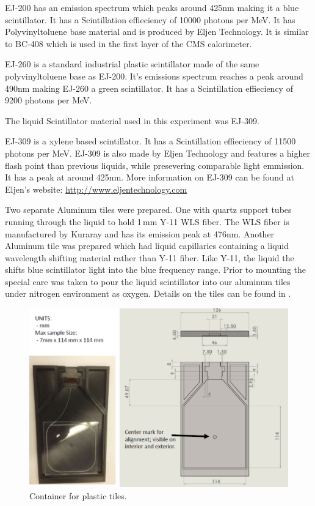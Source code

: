 \documentclass[review]{elsarticle}
\begin{document}
EJ-200 has an emission spectrum which peaks around 425nm making it a blue scintillator. 
It has a Scintillation effieciency of 10000 photons per MeV.
It has Polyvinyltoluene base material and is produced by Eljen Technology. 
It is similar to BC-408 which is used in the first layer of the CMS calorimeter.

EJ-260 is a standard industrial plastic scintillator made of the same polyvinyltoluene base as EJ-200.
It's emissions spectrum reaches a peak around 490nm making EJ-260 a green scintillator. 
It has a Scintillation effieciency of 9200 photons per MeV.

The liquid  Scintillator material used in this experiment was EJ-309. 

EJ-309 is a xylene based scintillator.
It has a Scintillation effieciency of 11500 photons per MeV.
EJ-309 is also made by Eljen Technology and features a higher flash point than previous liquids, while presevering comparable light emmission.
It has a peak at around 425nm. 
More information on EJ-309 can be found at Eljen's website: \url{http://www.eljentechnology.com} 

Two separate Aluminum tiles were prepared. 
One with quartz support tubes running through the liquid to hold 1\,mm Y-11 WLS fiber.
The WLS fiber is manufactured by Kuraray and has its emission peak at 476nm. 
Another Aluminum tile was prepared which had liquid capillaries containing a liquid wavelength shifting material rather than Y-11 fiber. 
Like Y-11, the liquid the shifts blue scintillator light into the blue frequency range. 
Prior to mounting the special care was taken to pour the liquid scintillator  into our aluminum tiles under nitrogen environment as oxygen.
Details on the tiles can be found in \cite{mdliquidtile}.


\begin{figure}[!ht]
\begin{center}
  \includegraphics[width=1\textwidth]{./figures/samplemount.pdf}
\caption{Container for plastic tiles.}

\label{fig:capilary tile}
\end{center}
\end{figure}
\end{document}
